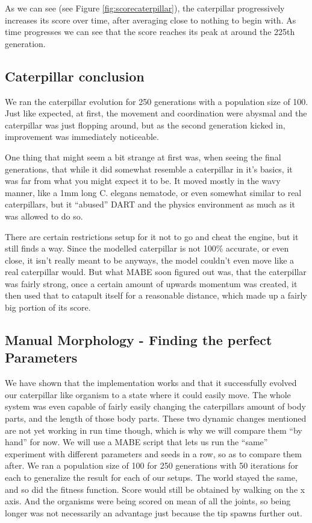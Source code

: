 \documentclass[12pt,oneside,listof=totoc,paper=a4,headings=small]{scrbook}
\begin{document}
As we can see (see Figure \ref{fig:scorecaterpillar}), the caterpillar progressively increases its score over time, after averaging close to nothing to begin with. As time progresses we can see that the score reaches its peak at around the 225th generation. 
\newpage
\subsection{Caterpillar conclusion}
We ran the caterpillar evolution for 250 generations with a population size of 100. Just like expected, at first, the movement and coordination were abysmal and the caterpillar was just flopping around, but as the second generation kicked in, improvement was immediately  noticeable. 

One thing that might seem a bit strange at first was, when seeing the final generations, that while it did somewhat resemble a caterpillar in it's basics, it was far from what you might expect it to be. It moved mostly in the wavy manner, like a 1mm long C. elegans nematode, or even somewhat similar to real caterpillars, but it ``abused'' DART and the physics environment as much as it was allowed to do so.

There are certain restrictions setup for it not to go and cheat the engine, but it still finds a way. Since the modelled caterpillar is not 100\% accurate, or even close, it isn't really meant to be anyways, the model couldn't even move like a real caterpillar would. But what MABE soon figured out was, that the caterpillar was fairly strong, once a certain amount of upwards momentum was created, it then used that to catapult itself for a reasonable distance, which made up a fairly big portion of its score.

\subsection {Manual Morphology - Finding the perfect Parameters}
We have shown that the implementation works and that it successfully evolved our caterpillar like organism to a state where it could easily move. The whole system was even capable of fairly easily changing the caterpillars amount of body parts, and the length of those body parts. These two dynamic changes mentioned are not yet working in run time though, which is why we will compare them ``by hand'' for now. We will use a MABE script that lets us run the ``same'' experiment with different parameters and seeds in a row, so as to compare them after. We ran a population size of 100 for 250 generations with 50 iterations for each to generalize the result for each of our setups. The world stayed the same, and so did the fitness function. Score would still be obtained by walking on the x axis. And the organisms were being scored on mean of all the joints, so being longer was not necessarily an advantage just because the tip spawns further out.
\end{document}
